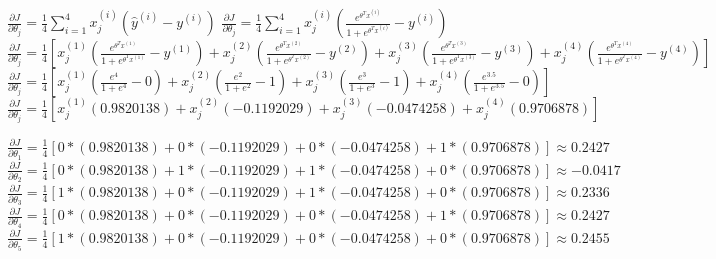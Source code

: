 \documentclass[11pt,addpoints,answers]{exam}
\begin{document}
\begin{questions}
    \begin{your_solution}[title=Work,height=18cm,width=15.3cm]
    $\frac{\partial J}{\partial \theta_j} = \frac{1}{4}\sum\limits_{i = 1}^4 x^{(i)}_j(\hat{y}^{(i)} - y^{(i)})$\newline
    $\frac{\partial J}{\partial \theta_j} = \frac{1}{4}\sum\limits_{i = 1}^4 x^{(i)}_j(\frac{e^{\theta^Tx^{(i)}}}{1 + e^{\theta^Tx^{(i)}}} - y^{(i)})$\newline
    $\frac{\partial J}{\partial \theta_j} = \frac{1}{4}[x^{(1)}_j(\frac{e^{\theta^Tx^{(1)}}}{1 + e^{\theta^Tx^{(1)}}} - y^{(1)}) + x^{(2)}_j(\frac{e^{\theta^Tx^{(2)}}}{1 + e^{\theta^Tx^{(2)}}} - y^{(2)}) + x^{(3)}_j(\frac{e^{\theta^Tx^{(3)}}}{1 + e^{\theta^Tx^{(3)}}} - y^{(3)}) + x^{(4)}_j(\frac{e^{\theta^Tx^{(4)}}}{1 + e^{\theta^Tx^{(4)}}} - y^{(4)})]$\newline
    $\frac{\partial J}{\partial \theta_j} = \frac{1}{4}[x^{(1)}_j(\frac{e^4}{1 + e^4} - 0) + x^{(2)}_j(\frac{e^2}{1 + e^2} - 1) + x^{(3)}_j(\frac{e^3}{1 + e^3} - 1) + x^{(4)}_j(\frac{e^{3.5}}{1 + e^{3.5}} - 0)]$\newline
    $\frac{\partial J}{\partial \theta_j} = \frac{1}{4}[x^{(1)}_j(0.9820138) + x^{(2)}_j(-0.1192029) + x^{(3)}_j(-0.0474258) + x^{(4)}_j(0.9706878)]$\newline\newline
    
    $\frac{\partial J}{\partial \theta_1} = \frac{1}{4}[0 *(0.9820138) + 0 * (-0.1192029) + 0 *(-0.0474258) + 1 *(0.9706878)] \approx 0.2427$\newline\newline
    $\frac{\partial J}{\partial \theta_2} = \frac{1}{4}[0 *(0.9820138) + 1 * (-0.1192029) + 1 *(-0.0474258) + 0 *(0.9706878)] \approx -0.0417$\newline\newline
    $\frac{\partial J}{\partial \theta_3} = \frac{1}{4}[1 *(0.9820138) + 0 * (-0.1192029) + 1 *(-0.0474258) + 0 *(0.9706878)] \approx 0.2336$\newline\newline
    $\frac{\partial J}{\partial \theta_4} = \frac{1}{4}[0 *(0.9820138) + 0 * (-0.1192029) + 0 *(-0.0474258) + 1 *(0.9706878)] \approx 0.2427$\newline\newline
    $\frac{\partial J}{\partial \theta_5} = \frac{1}{4}[1 *(0.9820138) + 0 * (-0.1192029) + 0 *(-0.0474258) + 0 *(0.9706878)] \approx 0.2455$\newline\newline
    \end{your_solution}


\end{questions}
\end{document}
